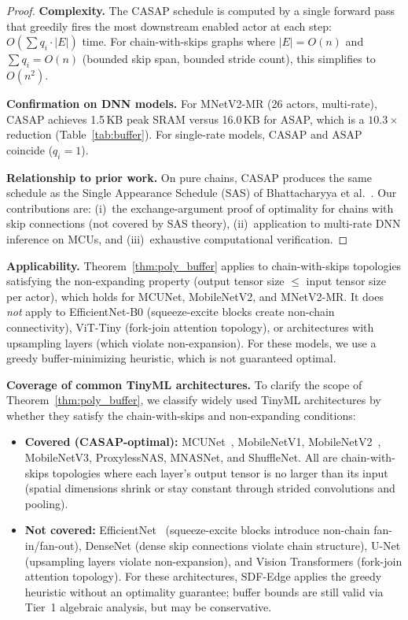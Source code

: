 \documentclass[journal]{IEEEtran}
\begin{document}
\begin{proof}
\textbf{Complexity.}
The CASAP schedule is computed by a single forward pass that greedily fires the most downstream enabled actor at each step: $O(\sum q_i \cdot |E|)$ time. For chain-with-skips graphs where $|E| = O(n)$ and $\sum q_i = O(n)$ (bounded skip span, bounded stride count), this simplifies to $O(n^2)$.

\textbf{Confirmation on DNN models.}
For MNetV2-MR (26 actors, multi-rate), CASAP achieves 1.5\,KB peak SRAM versus 16.0\,KB for ASAP, which is a $10.3\times$ reduction (Table~\ref{tab:buffer}).
For single-rate models, CASAP and ASAP coincide ($q_i = 1$).

\textbf{Relationship to prior work.}
On pure chains, CASAP produces the same schedule as the Single Appearance Schedule (SAS) of Bhattacharyya et al.~\cite{bhattacharyya1996software}.
Our contributions are: (i)~the exchange-argument proof of optimality for chains with skip connections (not covered by SAS theory), (ii)~application to multi-rate DNN inference on MCUs, and (iii)~exhaustive computational verification.
\end{proof}

\textbf{Applicability.}
Theorem~\ref{thm:poly_buffer} applies to chain-with-skips topologies satisfying the non-expanding property (output tensor size $\leq$ input tensor size per actor), which holds for MCUNet, MobileNetV2, and MNetV2-MR.
It does \emph{not} apply to EfficientNet-B0 (squeeze-excite blocks create non-chain connectivity), ViT-Tiny (fork-join attention topology), or architectures with upsampling layers (which violate non-expansion).
For these models, we use a greedy buffer-minimizing heuristic, which is not guaranteed optimal.

\textbf{Coverage of common TinyML architectures.}
To clarify the scope of Theorem~\ref{thm:poly_buffer}, we classify widely used TinyML architectures by whether they satisfy the chain-with-skips and non-expanding conditions:
\begin{itemize}[nosep]
\item \textbf{Covered (CASAP-optimal):} MCUNet~\cite{lin2020mcunet}, MobileNetV1, MobileNetV2~\cite{sandler2018mobilenetv2}, MobileNetV3, ProxylessNAS, MNASNet, and ShuffleNet. All are chain-with-skips topologies where each layer's output tensor is no larger than its input (spatial dimensions shrink or stay constant through strided convolutions and pooling).
\item \textbf{Not covered:} EfficientNet~\cite{tan2019efficientnet} (squeeze-excite blocks introduce non-chain fan-in/fan-out), DenseNet (dense skip connections violate chain structure), U-Net (upsampling layers violate non-expansion), and Vision Transformers (fork-join attention topology). For these architectures, SDF-Edge applies the greedy heuristic without an optimality guarantee; buffer bounds are still valid via Tier~1 algebraic analysis, but may be conservative.
\end{itemize}
\end{document}
